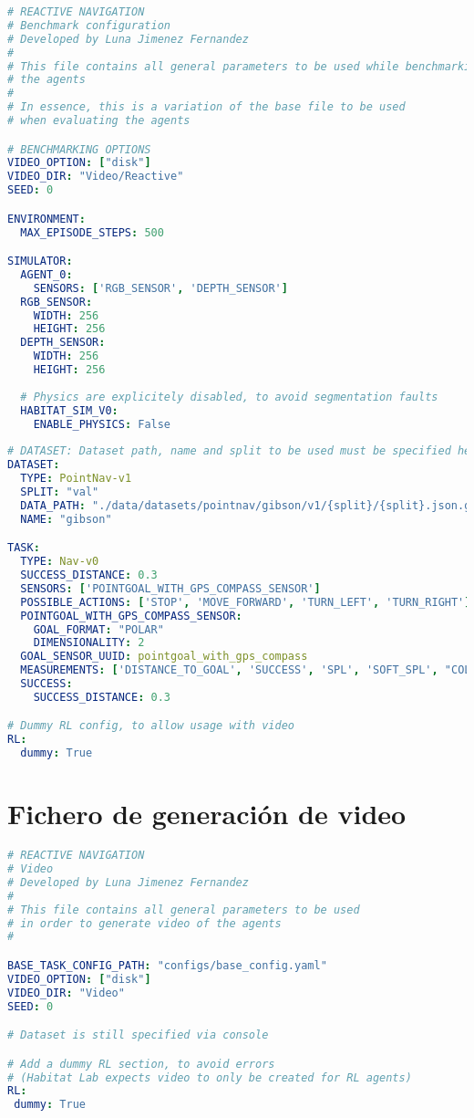 \begin{lstlisting}[language=yaml]
# REACTIVE NAVIGATION
# Benchmark configuration
# Developed by Luna Jimenez Fernandez
#
# This file contains all general parameters to be used while benchmarking
# the agents
#
# In essence, this is a variation of the base file to be used
# when evaluating the agents

# BENCHMARKING OPTIONS
VIDEO_OPTION: ["disk"]
VIDEO_DIR: "Video/Reactive"
SEED: 0

ENVIRONMENT:
  MAX_EPISODE_STEPS: 500

SIMULATOR:
  AGENT_0:
    SENSORS: ['RGB_SENSOR', 'DEPTH_SENSOR']
  RGB_SENSOR:
    WIDTH: 256
    HEIGHT: 256
  DEPTH_SENSOR:
    WIDTH: 256
    HEIGHT: 256
    
  # Physics are explicitely disabled, to avoid segmentation faults
  HABITAT_SIM_V0:
    ENABLE_PHYSICS: False
    
# DATASET: Dataset path, name and split to be used must be specified here
DATASET:
  TYPE: PointNav-v1
  SPLIT: "val"
  DATA_PATH: "./data/datasets/pointnav/gibson/v1/{split}/{split}.json.gz"
  NAME: "gibson"

TASK:
  TYPE: Nav-v0
  SUCCESS_DISTANCE: 0.3
  SENSORS: ['POINTGOAL_WITH_GPS_COMPASS_SENSOR']
  POSSIBLE_ACTIONS: ['STOP', 'MOVE_FORWARD', 'TURN_LEFT', 'TURN_RIGHT']
  POINTGOAL_WITH_GPS_COMPASS_SENSOR:
    GOAL_FORMAT: "POLAR"
    DIMENSIONALITY: 2
  GOAL_SENSOR_UUID: pointgoal_with_gps_compass
  MEASUREMENTS: ['DISTANCE_TO_GOAL', 'SUCCESS', 'SPL', 'SOFT_SPL', "COLLISIONS"]
  SUCCESS:
    SUCCESS_DISTANCE: 0.3

# Dummy RL config, to allow usage with video
RL:
  dummy: True
\end{lstlisting}

\section{Fichero de generación de video}

\begin{lstlisting}[language=yaml]
# REACTIVE NAVIGATION
# Video
# Developed by Luna Jimenez Fernandez
#
# This file contains all general parameters to be used 
# in order to generate video of the agents
#

BASE_TASK_CONFIG_PATH: "configs/base_config.yaml"
VIDEO_OPTION: ["disk"]
VIDEO_DIR: "Video"
SEED: 0

# Dataset is still specified via console

# Add a dummy RL section, to avoid errors
# (Habitat Lab expects video to only be created for RL agents)
RL:
 dummy: True

\end{lstlisting}

